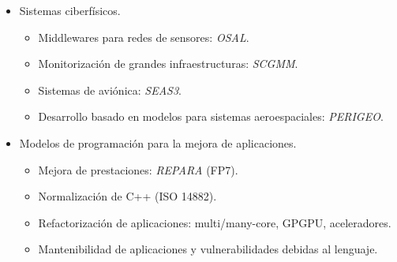\begin{frame}
  \begin{itemize}
    \item Sistemas ciberfísicos.
      \begin{itemize}
        \item Middlewares para redes de sensores: \emph{OSAL}.
        \item Monitorización de grandes infraestructuras: \emph{SCGMM}.
        \item Sistemas de aviónica: \emph{SEAS3}.
        \item Desarrollo basado en modelos para sistemas aeroespaciales: \emph{PERIGEO}.
      \end{itemize}
    \vspace{1em}
    \item \pause Modelos de programación para la mejora de aplicaciones.
      \begin{itemize}
        \item Mejora de prestaciones: \emph{REPARA} (FP7).
        \item Normalización de C++ (ISO 14882).
        \item Refactorización de aplicaciones: multi/many-core, GPGPU, aceleradores.
        \item Mantenibilidad de aplicaciones y vulnerabilidades debidas al lenguaje.
      \end{itemize}
  \end{itemize}
\end{frame}

